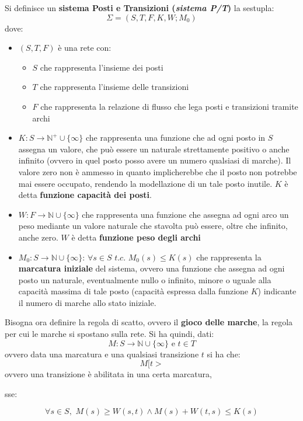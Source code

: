 \documentclass[a4paper,12pt, oneside]{book}
\begin{document}
\begin{definizione}
  Si definisce un \textbf{sistema Posti e Transizioni (\textit{sistema P/T})} la
  sestupla: 
  \[\Sigma=(S,T,F,K,W;M_0)\]
  dove:
  \begin{itemize}
    \item $(S,T,F)$ è una rete con:
    \begin{itemize}
      \item $S$ che rappresenta l'insieme dei posti
      \item $T$ che rappresenta l'insieme delle transizioni
      \item $F$ che rappresenta la relazione di flusso che lega posti e
      transizioni tramite archi
    \end{itemize}
    \item $K:S\to\mathbb{N}^{+}\cup \{\infty\}$ che rappresenta una funzione che
    ad ogni posto in $S$ assegna un valore, che può essere un naturale
    strettamente positivo o anche infinito (ovvero in quel posto posso avere un
    numero qualsiasi di marche). Il valore zero non è ammesso in quanto
    implicherebbe che il posto non potrebbe mai essere occupato, rendendo la
    modellazione di un tale posto inutile. $K$ è detta \textbf{funzione
      capacità dei posti}.
    \item $W:F\to\mathbb{N}\cup \{\infty\}$  che rappresenta una funzione che
    assegna ad ogni arco un peso mediante un valore naturale che stavolta può
    essere, oltre che infinito, anche zero. $W$ è detta \textbf{funzione peso
      degli archi}
    \item $M_0:S\to \mathbb{N}\cup\{\infty\}:\,\forall s\in
    S\,\,t.c.\,\,M_0(s)\leq K(s)$ che rappresenta la \textbf{marcatura iniziale}
    del sistema, ovvero una funzione che assegna ad ogni posto un naturale,
    eventualmente nullo o infinito, minore o uguale alla capacità massima di
    tale posto (capacità espressa dalla funzione $K$) indicante il numero di
    marche allo stato iniziale. 
  \end{itemize}
  Bisogna ora definire la regola di scatto, ovvero il \textbf{gioco delle
    marche}, la regola per cui le marche si spostano sulla rete. Si ha quindi,
  dati:
  \[M:S\to\mathbb{N}\cup \{\infty\}\mbox{ e }t\in T\]
  ovvero data una marcatura e una qualsiasi transizione $t$ si ha che:
  \[M[t>\]
  ovvero una transizione è abilitata in una certa marcatura,
  \begin{center}
    sse:
  \end{center}
  \[\forall s\in S,\,\,M(s)\geq W(s,t)\wedge M(s)+W(t,s)\leq K(s)\]

\end{definizione}
\end{document}
